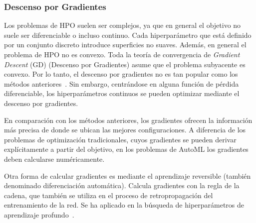 \subsubsection{Descenso por Gradientes}


Los problemas de HPO suelen ser complejos, ya que en general el objetivo no suele ser diferenciable o incluso continuo. Cada hiperparámetro que está definido por un conjunto discreto introduce superficies no suaves. Además, en general el problema de HPO no es convexo. Toda la teoría de convergencia de \textit{Gradient Descent} (GD) (Descenso por Gradientes) asume que el problema subyacente es convexo. Por lo tanto, el descenso por gradientes no es tan popular como los métodos anteriores~\cite{dai2020lower}. Sin embargo, centrándose en alguna función de pérdida diferenciable, los hiperparámetros continuos se pueden optimizar mediante el descenso por gradientes.

En comparación con los métodos anteriores, los gradientes ofrecen la información más precisa de donde se ubican las mejores configuraciones. A diferencia de los problemas de optimización tradicionales, cuyos gradientes se pueden derivar explícitamente a partir del objetivo, en los problemas de AutoML los gradientes deben calcularse numéricamente.


Otra forma de calcular gradientes es mediante el aprendizaje reversible \cite{maclaurin2015gradient} (también denominado diferenciación automática). Calcula gradientes con la regla de la cadena, que también se utiliza en el proceso de retropropagación del entrenamiento de la red. Se ha aplicado en la búsqueda de hiperparámetros de aprendizaje profundo~\cite{maclaurin2015gradient, franceschi2017forward}. 


